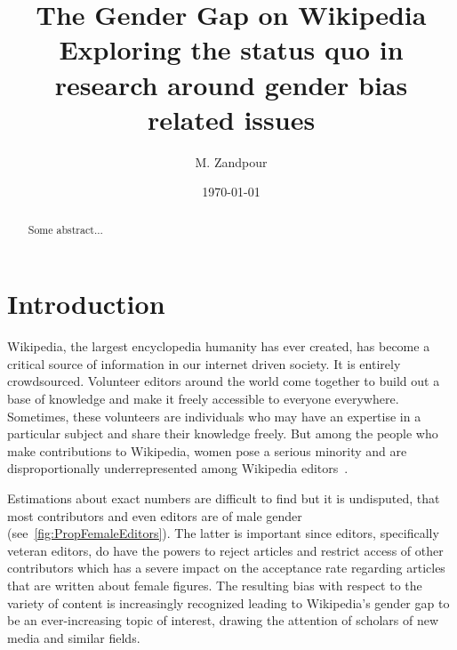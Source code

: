 \documentclass[a4paper, 11pt]{article}
\title{%
	The Gender Gap on Wikipedia \\
	\large{
		Exploring the status quo in research around gender bias related issues
	}
}
\begin{document}
\date{\today}
\author{M. Zandpour}
\maketitle

\begin{abstract}
Some abstract...
\end{abstract}

\section{Introduction} \label{sec:intro}

Wikipedia, the largest encyclopedia humanity has ever created, has become a critical source of information in our internet driven society. It is entirely crowdsourced. Volunteer editors around the world come together to build out a base of knowledge and make it freely accessible to everyone everywhere. Sometimes, these volunteers are individuals who may have an expertise in a particular subject and share their knowledge freely. But among the people who make contributions to Wikipedia, women pose a serious minority and are disproportionally underrepresented among Wikipedia editors~\cite{shammaa2014}.

Estimations about exact numbers are difficult to find but it is undisputed, that most contributors and even editors are of male gender (see~\autoref{fig:PropFemaleEditors}). The latter is important since editors, specifically veteran editors, do have the powers to reject articles and restrict access of other contributors which has a severe impact on the acceptance rate regarding articles that are written about female figures. The resulting bias with respect to the variety of content is increasingly recognized leading to Wikipedia’s gender gap to be an ever-increasing topic of interest, drawing the attention of scholars of new media and similar fields.
\end{document}
